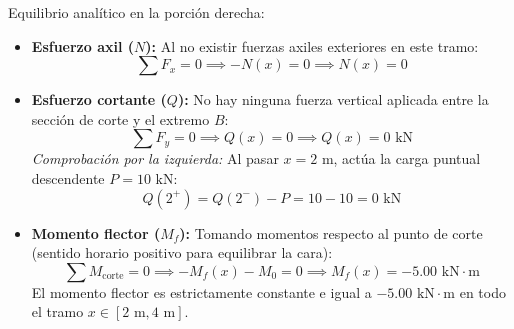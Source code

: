 Equilibrio analítico en la porción derecha:
\begin{itemize}
    \item \textbf{Esfuerzo axil ($N$):}
          Al no existir fuerzas axiles exteriores en este tramo:
          \begin{equation}
              \sum F_x = 0 \implies -N(x) = 0 \implies \boxed{N(x) = 0}
          \end{equation}

    \item \textbf{Esfuerzo cortante ($Q$):}
          No hay ninguna fuerza vertical aplicada entre la sección de corte y el extremo $B$:
          \begin{equation}
              \sum F_y = 0 \implies Q(x) = 0 \implies \boxed{Q(x) = 0\text{ kN}}
          \end{equation}
          \textit{Comprobación por la izquierda:} Al pasar $x = 2\text{ m}$, actúa la carga puntual descendente $P = 10\text{ kN}$:
          \[
              Q(2^+) = Q(2^-) - P = 10 - 10 = 0\text{ kN}
          \]

    \item \textbf{Momento flector ($M_f$):}
          Tomando momentos respecto al punto de corte (sentido horario positivo para equilibrar la cara):
          \begin{equation}
              \sum M_{\text{corte}} = 0 \implies -M_f(x) - M_0 = 0 \implies \boxed{M_f(x) = -5.00\text{ kN}\cdot\text{m}}
          \end{equation}
          El momento flector es estrictamente constante e igual a $-5.00\text{ kN}\cdot\text{m}$ en todo el tramo $x \in [2\text{ m}, 4\text{ m}]$.
\end{itemize}



